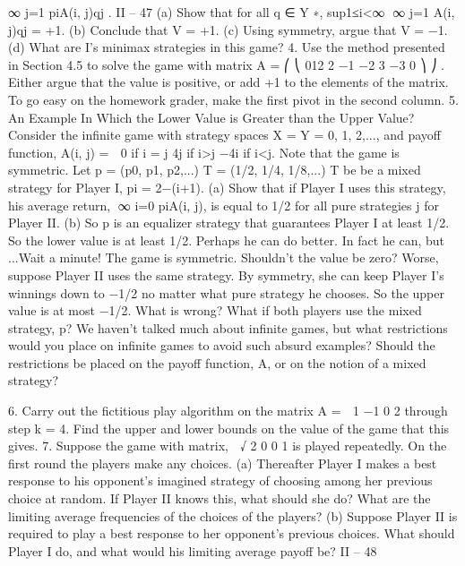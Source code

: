 ∞
j=1
piA(i, j)qj .
II – 47
(a) Show that for all q ∈ Y ∗, sup1≤i<∞
∞
j=1 A(i, j)qj = +1.
(b) Conclude that V = +1.
(c) Using symmetry, argue that V = −1.
(d) What are I’s minimax strategies in this game?
4. Use the method presented in Section 4.5 to solve the game with matrix
A =
⎛
⎝
012
2 −1 −2
3 −3 0
⎞
⎠ .
Either argue that the value is positive, or add +1 to the elements of the matrix. To go
easy on the homework grader, make the first pivot in the second column.
5. An Example In Which the Lower Value is Greater than the Upper
Value? Consider the infinite game with strategy spaces X = Y = {0, 1, 2,...}, and payoff
function,
A(i, j) =  0 if i = j
4j if i>j
−4i if i<j.
Note that the game is symmetric. Let p = (p0, p1, p2,...)
T = (1/2, 1/4, 1/8,...)
T be be a
mixed strategy for Player I, pi = 2−(i+1).
(a) Show that if Player I uses this strategy, his average return, ∞
i=0 piA(i, j), is equal
to 1/2 for all pure strategies j for Player II.
(b) So p is an equalizer strategy that guarantees Player I at least 1/2. So the lower
value is at least 1/2. Perhaps he can do better. In fact he can, but ...Wait a minute! The
game is symmetric. Shouldn’t the value be zero? Worse, suppose Player II uses the same
strategy. By symmetry, she can keep Player I’s winnings down to −1/2 no matter what
pure strategy he chooses. So the upper value is at most −1/2. What is wrong? What
if both players use the mixed strategy, p? We haven’t talked much about infinite games,
but what restrictions would you place on infinite games to avoid such absurd examples?
Should the restrictions be placed on the payoff function, A, or on the notion of a mixed
strategy?

6. Carry out the fictitious play algorithm on the matrix A =
 1 −1
0 2
through step
k = 4. Find the upper and lower bounds on the value of the game that this gives.
7. Suppose the game with matrix,  √
2 0
0 1
is played repeatedly. On the first round
the players make any choices.
(a) Thereafter Player I makes a best response to his opponent’s imagined strategy of
choosing among her previous choice at random. If Player II knows this, what should she
do? What are the limiting average frequencies of the choices of the players?
(b) Suppose Player II is required to play a best response to her opponent’s previous
choices. What should Player I do, and what would his limiting average payoff be?
II – 48

